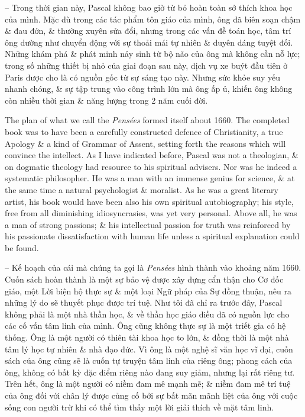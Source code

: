 \documentclass{article}
\begin{document}
\begin{enumerate}
\begin{itemize}
		-- Trong thời gian này, {\sc Pascal} không bao giờ từ bỏ hoàn toàn sở thích khoa học của mình. Mặc dù trong các tác phẩm tôn giáo của mình, ông đã biên soạn chậm \& đau đớn, \& thường xuyên sửa đổi, nhưng trong các vấn đề toán học, tâm trí ông dường như chuyển động với sự thoải mái tự nhiên \& duyên dáng tuyệt đối. Những khám phá \& phát minh nảy sinh từ bộ não của ông mà không cần nỗ lực; trong số những thiết bị nhỏ của giai đoạn sau này, dịch vụ xe buýt đầu tiên ở Paris được cho là có nguồn gốc từ sự sáng tạo này. Nhưng sức khỏe suy yếu nhanh chóng, \& sự tập trung vào công trình lớn mà ông ấp ủ, khiến ông không còn nhiều thời gian \& năng lượng trong 2 năm cuối đời.
		
		The plan of what we call the {\it Pens\'ees} formed itself about 1660. The completed book was to have been a carefully constructed defence of Christianity, a true Apology \& a kind of Grammar of Assent, setting forth the reasons which will convince the intellect. As I have indicated before, {\sc Pascal} was not a theologian, \& on dogmatic theology had resource to his spiritual advisers. Nor was he indeed a systematic philosopher. He was a man with an immense genius for science, \& at the same time a natural psychologist \& moralist. As he was a great literary artist, his book would have been also his own spiritual autobiography; his style, free from all diminishing idiosyncrasies, was yet very personal. Above all, he was a man of strong passions; \& his intellectual passion for truth was reinforced by his passionate dissatisfaction with human life unless a spiritual explanation could be found.
		
		-- Kế hoạch của cái mà chúng ta gọi là {\it Pens\'ees} hình thành vào khoảng năm 1660. Cuốn sách hoàn thành là một sự bảo vệ được xây dựng cẩn thận cho Cơ đốc giáo, một Lời biện hộ thực sự \& một loại Ngữ pháp của Sự đồng thuận, nêu ra những lý do sẽ thuyết phục được trí tuệ. Như tôi đã chỉ ra trước đây, {\sc Pascal} không phải là một nhà thần học, \& về thần học giáo điều đã có nguồn lực cho các cố vấn tâm linh của mình. Ông cũng không thực sự là một triết gia có hệ thống. Ông là một người có thiên tài khoa học to lớn, \& đồng thời là một nhà tâm lý học tự nhiên \& nhà đạo đức. Vì ông là một nghệ sĩ văn học vĩ đại, cuốn sách của ông cũng sẽ là cuốn tự truyện tâm linh của riêng ông; phong cách của ông, không có bất kỳ đặc điểm riêng nào đang suy giảm, nhưng lại rất riêng tư. Trên hết, ông là một người có niềm đam mê mạnh mẽ; \& niềm đam mê trí tuệ của ông đối với chân lý được củng cố bởi sự bất mãn mãnh liệt của ông với cuộc sống con người trừ khi có thể tìm thấy một lời giải thích về mặt tâm linh.
		

\end{itemize}
\end{enumerate}
\end{document}
